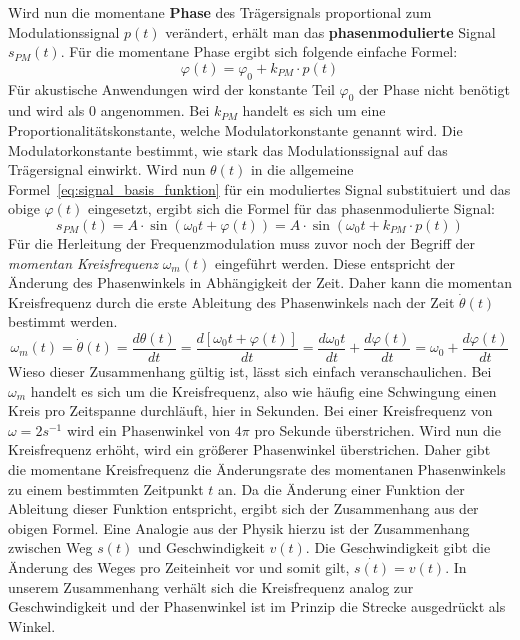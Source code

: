 Wird nun die momentane \textbf{Phase} des Trägersignals proportional zum Modulationssignal \(p(t)\) verändert, erhält man das \textbf{phasenmodulierte} Signal \(s_{PM}(t)\). \cite[S. 209]{lathi}
Für die momentane Phase ergibt sich folgende einfache Formel:
\begin{equation}
\varphi(t)=\varphi_0+k_{PM}\cdot p(t)
\label{eq:varphi_t}
\end{equation}
Für akustische Anwendungen wird der konstante Teil \(\varphi_0\) der Phase nicht benötigt und wird als 0 angenommen. Bei \(k_{PM}\) handelt es sich um eine Proportionalitätskonstante, welche Modulatorkonstante genannt wird. Die Modulatorkonstante bestimmt, wie stark das Modulationssignal auf das Trägersignal einwirkt. Wird nun \(\theta(t)\) in die allgemeine Formel~\ref{eq:signal_basis_funktion} für ein moduliertes Signal substituiert und das obige \(\varphi(t)\) eingesetzt, ergibt sich die Formel für das phasenmodulierte Signal:
\begin{equation}
s_{PM}(t)=A\cdot\sin(\omega_0t + \varphi(t))=A\cdot\sin(\omega_0t+k_{PM}\cdot p(t))
\label{eq:s_pm}
\end{equation}
Für die Herleitung der Frequenzmodulation muss zuvor noch der Begriff der \textit{momentan Kreisfrequenz} \(\omega_m(t)\) eingeführt werden.
Diese entspricht der Änderung des Phasenwinkels in Abhängigkeit der Zeit. Daher kann die momentan Kreisfrequenz durch die erste Ableitung des Phasenwinkels nach der Zeit $\dot \theta(t)$ bestimmt werden. \cite[S. 209]{lathi}
\begin{equation}
\omega_m(t)=\dot \theta(t)=\frac{d\theta(t)}{dt}=\frac{d[\omega_0t+\varphi(t)]}{dt}=\frac{d\omega_0t}{dt}+\frac{d\varphi(t)}{dt}=\omega_0+\frac{d\varphi(t)}{dt}
\label{eq:omega_m_herleitung}
\end{equation}
Wieso dieser Zusammenhang gültig ist, lässt sich einfach veranschaulichen. Bei \(\omega_m\) handelt es sich um die Kreisfrequenz, also wie häufig eine Schwingung einen Kreis pro Zeitspanne durchläuft, hier in Sekunden. Bei einer Kreisfrequenz von \(\omega=2 s^{-1}\) wird ein Phasenwinkel von \(4\pi\) pro Sekunde überstrichen. Wird nun die Kreisfrequenz erhöht, wird ein größerer Phasenwinkel überstrichen. Daher gibt die momentane Kreisfrequenz die Änderungsrate des momentanen Phasenwinkels zu einem bestimmten Zeitpunkt \(t\) an. Da die Änderung einer Funktion der Ableitung dieser Funktion entspricht, ergibt sich der Zusammenhang aus der obigen Formel. Eine Analogie aus der Physik hierzu ist der Zusammenhang zwischen Weg \(s(t)\) und Geschwindigkeit \(v(t)\). Die Geschwindigkeit gibt die Änderung des Weges pro Zeiteinheit vor und somit gilt, \(\dot{s(t)}=v(t)\). In unserem Zusammenhang verhält sich die Kreisfrequenz analog zur Geschwindigkeit und der Phasenwinkel ist im Prinzip die Strecke ausgedrückt als Winkel.

